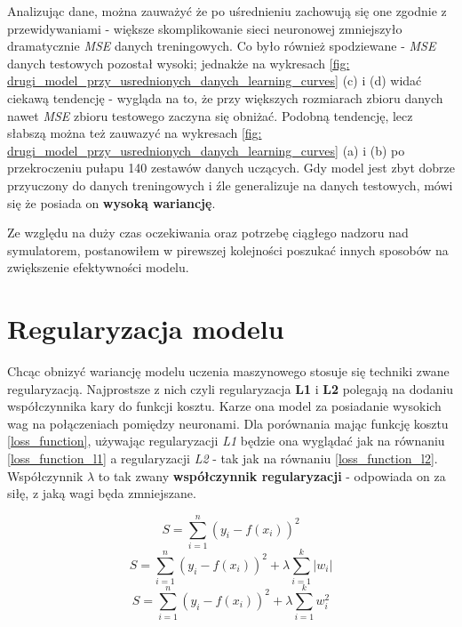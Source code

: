 \documentclass[12pt]{aghdpl}
\begin{document}
		Analizując dane, można zauważyć że po uśrednieniu zachowują się one zgodnie z przewidywaniami - większe skomplikowanie sieci neuronowej zmniejszyło dramatycznie \textit{MSE} danych treningowych. Co było również spodziewane - \textit{MSE} danych testowych pozostał wysoki; jednakże na wykresach \ref{fig: drugi_model_przy_usrednionych_danych_learning_curves} (c) i (d) widać ciekawą tendencję - wygląda na to, że przy większych rozmiarach zbioru danych nawet \textit{MSE} zbioru testowego zaczyna się obniżać. Podobną tendencję, lecz słabszą można też zauwazyć na wykresach \ref{fig: drugi_model_przy_usrednionych_danych_learning_curves} (a) i (b) po przekroczeniu pułapu 140 zestawów danych uczących. Gdy model jest zbyt dobrze przyuczony do danych treningowych i źle generalizuje na danych testowych, mówi się że posiada on \textbf{wysoką wariancję}.
		
		Ze względu na duży czas oczekiwania oraz potrzebę ciągłego nadzoru nad symulatorem, postanowiłem w pirewszej kolejności poszukać innych sposobów na zwiększenie efektywności modelu.
		
		\section{Regularyzacja modelu} \label{regularyzacja_modelu}
		Chcąc obnizyć wariancję modelu uczenia maszynowego stosuje się techniki zwane regularyzacją. Najprostsze z nich czyli regularyzacja \textbf{L1} i \textbf{L2} polegają na dodaniu współczynnika kary do funkcji kosztu. Karze ona model za posiadanie wysokich wag na połączeniach pomiędzy neuronami. Dla porównania mając funkcję kosztu \ref{loss_function}, używając regularyzacji \textit{L1} będzie ona wyglądać jak na równaniu \ref{loss_function_l1} a regularyzacji \textit{L2} - tak jak na równaniu \ref{loss_function_l2}. Współczynnik $\lambda$ to tak zwany \textbf{współczynnik regularyzacji} - odpowiada on za siłę, z jaką wagi będa zmniejszane.
		
		\begin{equation} \label{loss_function}
		S = \sum_{i = 1}^n (y_i - f(x_i))^2
		\end{equation}
		\begin{equation} \label{loss_function_l1}
		S = \sum_{i = 1}^n (y_i - f(x_i))^2 + \lambda \sum_{i = 1}^k |w_i|
		\end{equation}
		\begin{equation} \label{loss_function_l2}
		S = \sum_{i = 1}^n (y_i - f(x_i))^2 + \lambda \sum_{i = 1}^k w_i^2
		\end{equation}
		
\end{document}
